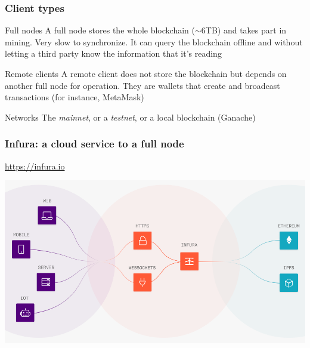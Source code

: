 \documentclass[11pt]{beamer}  %
\begin{document}
\begin{frame}\frametitle{Client types}

  \begin{greenbox}{Full nodes}
    A full node stores the whole blockchain ($\sim$6TB) and
    takes part in mining. Very slow to synchronize.
    It can query the blockchain offline and
    without letting a third party know the information that it's reading
  \end{greenbox}

  \bigskip

  \begin{greenbox}{Remote clients}
    A remote client does not store the blockchain but
    depends on another full node for operation. They are wallets
    that create and broadcast transactions (for instance, MetaMask)
  \end{greenbox}

  \bigskip

  \begin{greenbox}{Networks}
    The \emph{mainnet}, or a \emph{testnet}, or a local blockchain (Ganache)
  \end{greenbox}
  
\end{frame}

\begin{frame}\frametitle{Infura: a cloud service to a full node}

  \url{https://infura.io}

  \begin{center}
    \includegraphics[width=\textwidth,clip=false]{pictures/infura.png}
  \end{center}

\end{frame}
\end{document}
